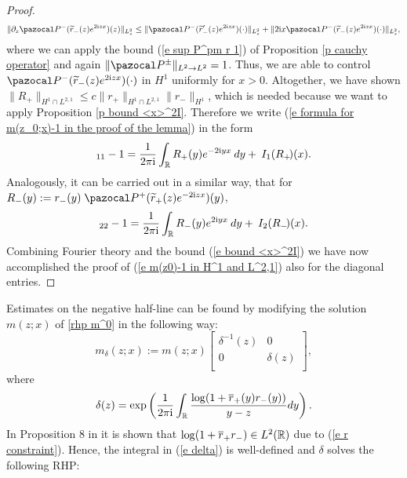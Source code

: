 \begin{proof}
    \begin{equation*}
        \|\partial_z \Pm (\widetilde{r}_-(z) e^{2\ii zx})(z)\|_{L^2_z}\leq \| \Pm (\widetilde{r}'_-(z) e^{2\ii zx})(\cdot)\|_{L^2_z} +\|2\ii x \Pm (\widetilde{r}_-(z) e^{2\ii zx})(\cdot)\|_{L^2_z},
    \end{equation*}
    where we can apply the bound (\ref{e sup P^pm r 1}) of Proposition \ref{p cauchy operator} and again $\|\Ppm\|_{L^2\to L^2}=1$. Thus, we are able to control  $\Pm (\widetilde{r}_-(z) e^{2\ii zx})(\cdot)$ in $H^1$ uniformly for $x>0$. Altogether, we have shown $\|R_+\|_ {H^1\cap L^{2,1}}\leq c \|r_+\|_ {H^1\cap L^{2,1}}\|r_-\|_ {H^1}$, which is needed because we want to apply Proposition \ref{p bound <x>^2I}. Therefore we write (\ref{e formula for m(z_0;x)-1 in the proof of the lemma}) in the form
    \begin{equation*}
        [m(z_0;x)]_{11}-1=\frac{1}{2\pi\ii} \int_{\Real} R_+(y)e^{-2\ii yx}\:dy+ \:I_1(R_+\!)(x).
    \end{equation*}
    Analogously, it can be carried out in a similar way, that for $R_-(y):=r_-(y)\;\Pp (\widetilde{r}_+(z) e^{-2\ii zx})(y)$,
    \begin{equation*}
        [m(z_0;x)]_{22}-1=\frac{1}{2\pi\ii} \int_{\Real} R_-(y)e^{2\ii yx}\:dy+ \:I_2(R_-\!)(x).
    \end{equation*}
    Combining Fourier theory and the bound (\ref{e bound <x>^2I}) we have now accomplished the proof of (\ref{e m(z0)-1 in H^1 and L^2,1}) also for the diagonal entries.
\end{proof}
Estimates on the negative half-line can be found by modifying the solution $m(z;x)$ of \rh \ref{rhp m^0} in the following way:
\begin{equation}\label{e def m delta}
    m_{\delta}(z;x):=m(z;x)
    \left[
      \begin{array}{cc}
        \delta^{-1}(z) & 0 \\
        0 & \delta(z) \\
      \end{array}
    \right],
\end{equation}
where
\begin{equation}\label{e delta}
    \delta(z)=\exp\left(\frac{1}{2\pi\mathrm{i}} \int_{\mathbb R}\frac{\log(1+ \overline{r}_+(y)r_-(y))}{y-z}dy\right).
\end{equation}
In Proposition 8 in \cite{Pelinovsky2016} it is shown that $\log(1+ \overline{r}_+r_-)\in L^2(\mathbb R)$ due to (\ref{e r constraint}). Hence, the integral in (\ref{e delta}) is well-defined and $\delta$ solves the following RHP:
